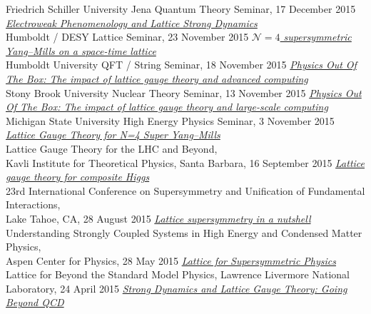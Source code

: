 \begin{spacelistout}
\begin{revnumerate}
      Friedrich Schiller University Jena Quantum Theory Seminar, 17 December 2015
    \pagebreakitem
      \textit{\href{http://www.davidschaich.net/talks/151123Humboldt.pdf}{Electroweak Phenomenology and Lattice Strong Dynamics}} \\
      Humboldt / DESY Lattice Seminar, 23 November 2015
    \pagebreakitem
      \textit{\href{http://www.davidschaich.net/talks/151118Humboldt.pdf}{$\mathcal N = 4$ supersymmetric Yang--Mills on a space-time lattice}} \\
      Humboldt University QFT / String Seminar, 18 November 2015
    \pagebreakitem
      \textit{\href{http://www.davidschaich.net/talks/1511StonyBrook.pdf}{Physics Out Of The Box: The impact of lattice gauge theory and advanced computing}} \\
      Stony Brook University Nuclear Theory Seminar, 13 November 2015
    \pagebreakitem
      \textit{\href{http://www.davidschaich.net/talks/1511MSU.pdf}{Physics Out Of The Box: The impact of lattice gauge theory and large-scale computing}} \\
      Michigan State University High Energy Physics Seminar, 3 November 2015
    \pagebreakitem
      \textit{\href{http://www.davidschaich.net/talks/1509KITP.pdf}{Lattice Gauge Theory for N=4 Super Yang--Mills}} \\
      Lattice Gauge Theory for the LHC and Beyond, \\ Kavli Institute for Theoretical Physics, Santa Barbara, 16 September 2015
    \pagebreakitem
      \textit{\href{http://www.davidschaich.net/talks/LGT4CH.pdf}{Lattice gauge theory for composite Higgs}} \\
      23rd International Conference on Supersymmetry and Unification of Fundamental Interactions, \\ Lake Tahoe, CA, 28 August 2015
    \pagebreakitem
      \textit{\href{http://www.davidschaich.net/talks/Aspen15.pdf}{Lattice supersymmetry in a nutshell}} \\
      Understanding Strongly Coupled Systems in High Energy and Condensed Matter Physics, \\ Aspen Center for Physics, 28 May 2015
    \pagebreakitem
      \textit{\href{http://www.davidschaich.net/talks/Livermore1504.pdf}{Lattice for Supersymmetric Physics}} \\
      Lattice for Beyond the Standard Model Physics, Lawrence Livermore National Laboratory, 24 April 2015
    \pagebreakitem
      \textit{\href{http://www.davidschaich.net/talks/Purdue1504.pdf}{Strong Dynamics and Lattice Gauge Theory: Going Beyond QCD}} \\

\end{revnumerate}
\end{spacelistout}

